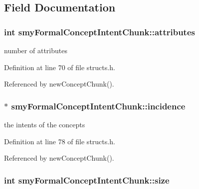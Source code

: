 \subsection{\-Field \-Documentation}
\hypertarget{structsmyFormalConceptIntentChunk_a5246108db3d065d2b9c46fedfc88dc0e}{
\subsubsection[{attributes}]{\setlength{\rightskip}{0pt plus 5cm}int {\bf smy\-Formal\-Concept\-Intent\-Chunk\-::attributes}}}\label{structsmyFormalConceptIntentChunk_a5246108db3d065d2b9c46fedfc88dc0e}


number of attributes 



\-Definition at line 70 of file structs.\-h.



\-Referenced by new\-Concept\-Chunk().

\hypertarget{structsmyFormalConceptIntentChunk_a1777b5eadbd74c4659580968817b3424}{
\subsubsection[{incidence}]{$\ast$ {\bf smy\-Formal\-Concept\-Intent\-Chunk\-::incidence}}}\label{structsmyFormalConceptIntentChunk_a1777b5eadbd74c4659580968817b3424}


the intents of the concepts 



\-Definition at line 78 of file structs.\-h.



\-Referenced by new\-Concept\-Chunk().

\hypertarget{structsmyFormalConceptIntentChunk_a39483f44afbcd1de56c41243c7a442aa}{
\subsubsection[{size}]{\setlength{\rightskip}{0pt plus 5cm}int {\bf smy\-Formal\-Concept\-Intent\-Chunk\-::size}}}\label{structsmyFormalConceptIntentChunk_a39483f44afbcd1de56c41243c7a442aa}


